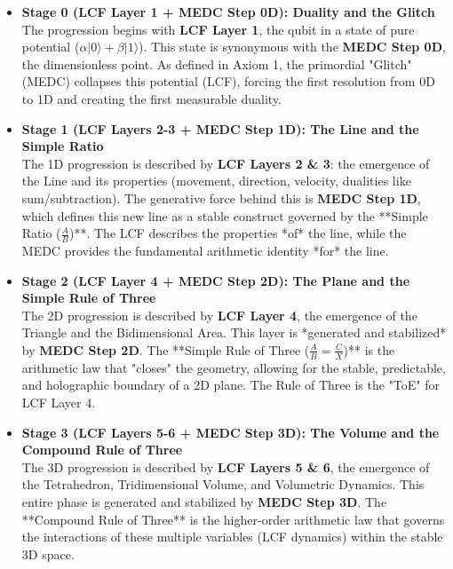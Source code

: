 \documentclass[11pt, a4paper]{article}
\begin{document}
		\begin{itemize}
			\item \textbf{Stage 0 (LCF Layer 1 + MEDC Step 0D): Duality and the Glitch}\\
			The progression begins with \textbf{LCF Layer 1}, the qubit in a state of pure potential ($\alpha|0\rangle + \beta|1\rangle$). This state is synonymous with the \textbf{MEDC Step 0D}, the dimensionless point. As defined in Axiom 1, the primordial "Glitch" (MEDC) collapses this potential (LCF), forcing the first resolution from 0D to 1D and creating the first measurable duality.
			
			\item \textbf{Stage 1 (LCF Layers 2-3 + MEDC Step 1D): The Line and the Simple Ratio}\\
			The 1D progression is described by \textbf{LCF Layers 2 \& 3}: the emergence of the Line and its properties (movement, direction, velocity, dualities like sum/subtraction). The generative force behind this is \textbf{MEDC Step 1D}, which defines this new line as a stable construct governed by the **Simple Ratio ($\frac{A}{B}$)**. The LCF describes the properties *of* the line, while the MEDC provides the fundamental arithmetic identity *for* the line.
			
			\item \textbf{Stage 2 (LCF Layer 4 + MEDC Step 2D): The Plane and the Simple Rule of Three}\\
			The 2D progression is described by \textbf{LCF Layer 4}, the emergence of the Triangle and the Bidimensional Area. This layer is *generated and stabilized* by \textbf{MEDC Step 2D}. The **Simple Rule of Three ($\frac{A}{B} = \frac{C}{X}$)** is the arithmetic law that "closes" the geometry, allowing for the stable, predictable, and holographic boundary of a 2D plane. The Rule of Three is the "ToE" for LCF Layer 4.
			
			\item \textbf{Stage 3 (LCF Layers 5-6 + MEDC Step 3D): The Volume and the Compound Rule of Three}\\
			The 3D progression is described by \textbf{LCF Layers 5 \& 6}, the emergence of the Tetrahedron, Tridimensional Volume, and Volumetric Dynamics. This entire phase is generated and stabilized by \textbf{MEDC Step 3D}. The **Compound Rule of Three** is the higher-order arithmetic law that governs the interactions of these multiple variables (LCF dynamics) within the stable 3D space.
			

\end{itemize}
\end{document}
